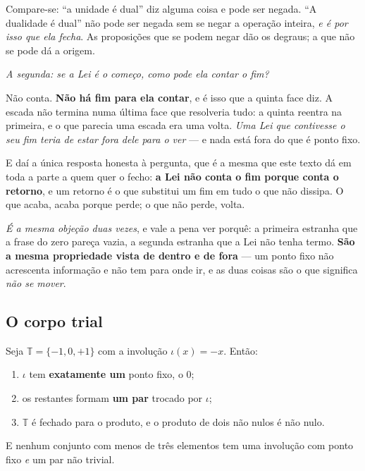\documentclass[livro.tex]{subfiles}
\begin{document}
\medskip
\noindent Compare-se: ``a unidade é dual'' diz alguma coisa e pode ser negada. ``A dualidade é
dual'' não pode ser negada sem se negar a operação inteira, \emph{e é por isso que ela fecha}. As
proposições que se podem negar dão os degraus; a que não se pode dá a origem.

\medskip
\noindent \emph{A segunda: se a Lei é o começo, como pode ela contar o fim?}

\medskip
\noindent Não conta. \textbf{Não há fim para ela contar}, e é isso que a quinta face diz. A
escada não termina numa última face que resolveria tudo: a quinta reentra na primeira, e o que
parecia uma escada era uma volta. \emph{Uma Lei que contivesse o seu fim teria de estar fora
dele para o ver} --- e nada está fora do que é ponto fixo.

\medskip
\noindent E daí a única resposta honesta à pergunta, que é a mesma que este texto dá em toda a
parte a quem quer o fecho: \textbf{a Lei não conta o fim porque conta o retorno}, e um retorno é o
que substitui um fim em tudo o que não dissipa. O que acaba, acaba porque perde; o que não perde,
volta.

\medskip
\noindent \emph{É a mesma objeção duas vezes}, e vale a pena ver porquê: a primeira estranha que a
frase do zero pareça vazia, a segunda estranha que a Lei não tenha termo. \textbf{São a mesma
propriedade vista de dentro e de fora} --- um ponto fixo não acrescenta informação e não tem para
onde ir, e as duas coisas são o que significa \emph{não se mover}.


\subsection{O corpo trial}\label{sec:corpotrial}

\begin{teorema}\label{thm:trial}
Seja $\mathbb{T}=\{-1,0,+1\}$ com a involução $\iota(x)=-x$. Então:
\begin{enumerate}\itemsep1pt
\item $\iota$ tem \textbf{exatamente um} ponto fixo, o $0$;
\item os restantes formam \textbf{um par} trocado por $\iota$;
\item $\mathbb{T}$ é fechado para o produto, e o produto de dois não nulos é não nulo.
\end{enumerate}
E nenhum conjunto com menos de três elementos tem uma involução com ponto fixo \emph{e} um par
não trivial.
\end{teorema}
\end{document}
